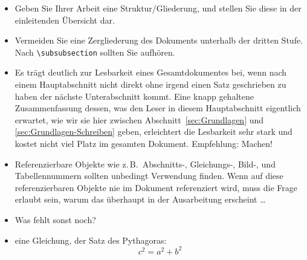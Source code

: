\begin{itemize}
\begin{itemize}
        Eine Ausnahme stellen hier jedoch insbesondere Datenblätter etc.~dar, da diese in der Regel aktueller sind als Kataloge in druckform. 
        
      \item
        Insbesondere: Wenn Sie den Inhalt Ihrer Arbeit
        komplett aus der Wikipedia herauskopieren,
        führt dies zu keiner guten Note.
      \item
        Es gibt seriöse und weniger seriöse Quellen.
        Internetdiskussionsforen gelten nicht als zuverlässige Quellen.
    \end{itemize}
  \item
    Geben Sie Ihrer Arbeit eine Struktur/Gliederung, und stellen Sie
    diese in der einleitenden Übersicht dar.
  \item
    Vermeiden Sie eine Zergliederung des Dokuments unterhalb der dritten Stufe.
    Nach \lstinline|\subsubsection| sollten Sie aufhören.
  \item
    Es trägt deutlich zur Lesbarkeit eines Gesamtdokumentes bei,
    wenn nach einem Hauptabschnitt nicht direkt ohne irgend einen
    Satz geschrieben zu haben der nächste Unterabschnitt kommt.
    Eine knapp gehaltene Zusammenfassung dessen,
    was den Leser in diesem Hauptabschnitt eigentlich erwartet,
    wie wir sie hier zwischen Abschnitt~\ref{sec:Grundlagen} und
    \ref{sec:Grundlagen-Schreiben} geben, erleichtert die Lesbarkeit
    sehr stark und kostet nicht viel Platz im gesamten Dokument.
    Empfehlung: Machen!
  \item
    Referenzierbare Objekte wie z.\,B.\ Abschnitts-, Gleichungs-, Bild-,
    und Tabellennummern sollten unbedingt Verwendung finden.
    Wenn auf diese referenzierbaren Objekte nie im Dokument referenziert wird,
    muss die Frage erlaubt sein, warum das überhaupt in der Ausarbeitung
    erscheint \dots
  \item
    Was fehlt sonst noch?
\item eine Gleichung, der Satz des Pythagoras: 
\begin{equation}
c^2 = a^2 + b^2
\end{equation}
\end{itemize}

